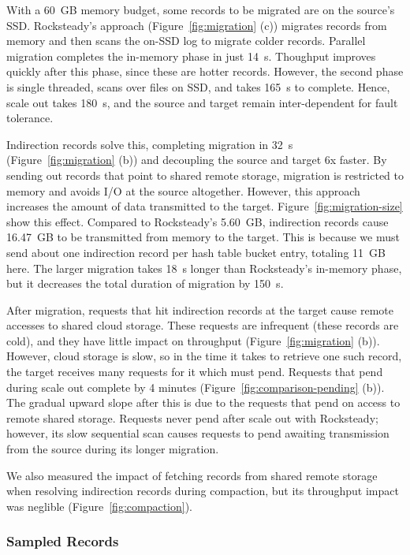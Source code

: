 With a 60~GB memory budget, some records to be migrated are on the source's
SSD.
%
Rocksteady's approach (Figure~\ref{fig:migration} (c)) migrates records from
memory and then scans the on-SSD log to migrate colder records.
%
Parallel migration completes the in-memory phase in just 14~s.
%
Thoughput improves quickly after this phase, since these are hotter records.
%
However, the second phase is single threaded, scans over files on SSD,
and takes 165~s to complete.
%
Hence, scale out takes 180~s, and the source and target remain inter-dependent
for fault tolerance.

Indirection records solve this, completing migration in 32~s
(Figure~\ref{fig:migration} (b)) and decoupling the source and target 6x faster.
%
By sending out records that point to shared remote storage, migration
is restricted to memory and avoids I/O at the source altogether.
%
%
However, this approach increases the amount of data transmitted to the target.
%
Figure~\ref{fig:migration-size} show this effect.
%
Compared to Rocksteady's 5.60~GB, indirection records cause
16.47~GB to be transmitted from memory to the target.
%
This is because we must send about one indirection record per hash table bucket
entry, totaling 11~GB here.
%
%
The larger migration takes 18~s longer than Rocksteady's in-memory phase, but it
decreases the total duration of migration by 150~s.

After migration, requests that hit indirection records at the
target cause remote accesses to shared cloud storage.
%
These requests are infrequent (these records are
cold), and they have little impact on throughput
(Figure~\ref{fig:migration} (b)).
%
However, cloud storage is slow, so in the time it takes to retrieve one such
record, the target receives many requests for it which must pend.
%
Requests that pend during scale out complete by 4 minutes
(Figure~\ref{fig:comparison-pending} (b)).
%
The gradual upward slope after this is due to the requests that
pend on access to remote shared storage.
%
Requests never pend after scale out with Rocksteady; however, its slow
sequential scan causes requests to pend awaiting transmission from the source
during its longer migration.

We also measured the impact of fetching records from shared remote storage when
resolving indirection records during compaction, but its throughput impact was
neglible (Figure~\ref{fig:compaction}).

\subsubsection{Sampled Records}
\label{sec:eval:sampling}

